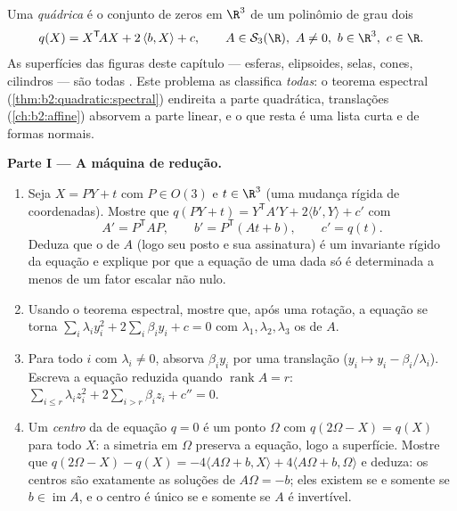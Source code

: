 \begin{problem}\label{pb:b2:surfaces:1}
Uma \emph{quádrica} é o conjunto de zeros em $\R^3$ de um
polinômio de grau dois
\[
q(X) = X^{\mathsf T}\!AX + 2\,\langle b, X\rangle + c,
\qquad A \in \mathcal S_3(\R),\ A \neq 0,\ b \in \R^3,\
c \in \R .
\]
As superfícies das figuras deste capítulo --- esferas,
elipsoides, selas, cones, cilindros --- são todas .
Este problema as classifica \emph{todas}: o teorema espectral
(\cref{thm:b2:quadratic:spectral}) endireita a parte quadrática,
translações \omterm{def:b2:affine:subspace}{afins} (\cref{ch:b2:affine}) absorvem a
parte linear, e o que resta é uma lista curta e  de
formas normais.

\medskip
\noindent\textbf{Parte I --- A máquina de redução.}
\begin{enumerate}
  \item Seja $X = PY + t$ com $P \in O(3)$ e $t \in \R^3$ (uma
        mudança rígida de coordenadas). Mostre que $q(PY + t) =
        Y^{\mathsf T}\!A'Y + 2\langle b', Y\rangle + c'$ com
        \[
        A' = P^{\mathsf T}\!AP, \qquad
        b' = P^{\mathsf T}(At + b), \qquad
        c' = q(t) .
        \]
        Deduza que o  de $A$ (logo seu posto e sua
        assinatura) é um invariante rígido da equação e
        explique por que a equação de uma dada  só é
        determinada a menos de um fator escalar não nulo.
  \item Usando o teorema espectral, mostre que, após uma rotação,
        a equação se torna $\sum_i \lambda_i y_i^2 +
        2\sum_i\beta_iy_i + c = 0$ com $\lambda_1, \lambda_2,
        \lambda_3$ os  de $A$.
  \item Para todo $i$ com $\lambda_i \neq 0$, absorva
        $\beta_iy_i$ por uma translação ($y_i \mapsto y_i -
        \beta_i/\lambda_i$). Escreva a equação reduzida quando
        $\operatorname{rank} A = r$: $\sum_{i\leq r}\lambda_i
        z_i^2 + 2\sum_{i > r}\beta_iz_i + c'' = 0$.
  \item Um \emph{centro} da  de equação $q = 0$ é
        um ponto $\Omega$ com $q(2\Omega - X) = q(X)$ para todo
        $X$: a simetria  em $\Omega$ preserva a
        equação, logo a superfície. Mostre que $q(2\Omega - X)
        - q(X) = -4\langle A\Omega + b, X\rangle + 4\langle
        A\Omega + b, \Omega\rangle$ e deduza: os centros
        são exatamente as soluções de $A\Omega = -b$; eles
        existem se e somente se $b \in \operatorname{im}A$, e o centro
        é único se e somente se $A$ é invertível.
\end{enumerate}


\end{problem}
